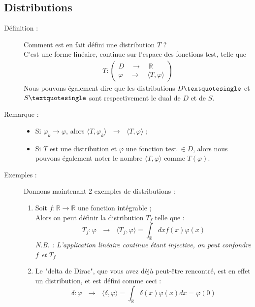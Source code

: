\documentclass[../notesdecours.tex]{subfiles}
\begin{document}
\subsection{Distributions}
\begin{description}
    \item [Définition :] Comment est en fait défini une distribution $T$ ? \\
    C'est une forme linéaire, continue sur l'espace des fonctions test, telle que 
    \begin{align*}
        T : \left( 
        \begin{array}{lll}
            D \quad \rightarrow \quad \mathbb{R} \\
            \varphi \quad \rightarrow \quad \langle T, \varphi \rangle
        \end{array} \right)
    \end{align*}
    Nous pouvons également dire que les distributions $D \textquotesingle$ et $S \textquotesingle$ sont respectivement le dual de $D$ et de $S$. \\
    \item [Remarque :] \strut 

    \begin{itemize}[label = \textbullet]
        \item Si $\varphi_k \rightarrow \varphi$, alors $\langle T, \varphi_k\rangle  \mbox{ } \rightarrow \mbox{ } \langle T, \varphi\rangle $ ;
        \item Si $T$ est une distribution et $\varphi$ une fonction test $\in D$, alors nous pouvons également noter le nombre $\langle T, \varphi\rangle $ comme $T(\varphi)$. 
    \end{itemize}
    \item [Exemples :] Donnons maintenant 2 exemples de distributions : 
    \begin{enumerate}
        \item Soit $f : \mathbb{R} \rightarrow \mathbb{R}$ une fonction intégrable ; \\
        Alors on peut définir la distribution $T_f$ telle que : \\
        \begin{equation}
            T_f : \varphi \mbox{ } \rightarrow \mbox{ } \langle T_f, \varphi\rangle  = \int_{\mathbb{R}} dx f(x) \varphi(x)
        \end{equation}
        \textit{N.B. : L'application linéaire continue étant injective, on peut confondre $f$ et $T_f$}
        \item Le "delta de Dirac", que vous avez déjà peut-être rencontré, est en effet un distribution, et est défini comme ceci : \\
        \begin{equation}
        \label{delta de dirac}
            \delta : \varphi \mbox{ } \rightarrow \mbox{ } \langle \delta, \varphi\rangle  = \int_{\mathbb{R}} \delta(x) \varphi(x)dx = \varphi(0)
        \end{equation}
        \end{enumerate}


\end{description}
\end{document}
